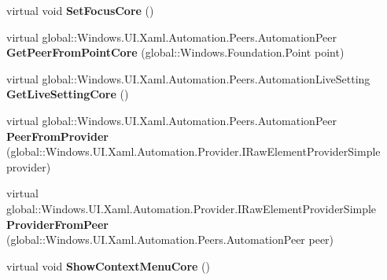\begin{DoxyCompactItemize}
virtual void {\bfseries Set\+Focus\+Core} ()
\item 
\mbox{\label{class_windows_1_1_u_i_1_1_xaml_1_1_automation_1_1_peers_1_1_automation_peer_af1a638c64d6aba46c623ea842fc206ac}} 
virtual global\+::\+Windows.\+U\+I.\+Xaml.\+Automation.\+Peers.\+Automation\+Peer {\bfseries Get\+Peer\+From\+Point\+Core} (global\+::\+Windows.\+Foundation.\+Point point)
\item 
\mbox{\label{class_windows_1_1_u_i_1_1_xaml_1_1_automation_1_1_peers_1_1_automation_peer_a237b9e6ecc2fb3779ea808e8460aaa07}} 
virtual global\+::\+Windows.\+U\+I.\+Xaml.\+Automation.\+Peers.\+Automation\+Live\+Setting {\bfseries Get\+Live\+Setting\+Core} ()
\item 
\mbox{\label{class_windows_1_1_u_i_1_1_xaml_1_1_automation_1_1_peers_1_1_automation_peer_afb1e787b7ca36dd06affdaa830a30a27}} 
virtual global\+::\+Windows.\+U\+I.\+Xaml.\+Automation.\+Peers.\+Automation\+Peer {\bfseries Peer\+From\+Provider} (global\+::\+Windows.\+U\+I.\+Xaml.\+Automation.\+Provider.\+I\+Raw\+Element\+Provider\+Simple provider)
\item 
\mbox{\label{class_windows_1_1_u_i_1_1_xaml_1_1_automation_1_1_peers_1_1_automation_peer_a8d1ce21375148b3c860bc66fa5df87fa}} 
virtual global\+::\+Windows.\+U\+I.\+Xaml.\+Automation.\+Provider.\+I\+Raw\+Element\+Provider\+Simple {\bfseries Provider\+From\+Peer} (global\+::\+Windows.\+U\+I.\+Xaml.\+Automation.\+Peers.\+Automation\+Peer peer)
\item 
\mbox{\label{class_windows_1_1_u_i_1_1_xaml_1_1_automation_1_1_peers_1_1_automation_peer_a4cf8c7b7bc669694fbf6115b9d508e66}} 
virtual void {\bfseries Show\+Context\+Menu\+Core} ()
\item 
\mbox{\label{class_windows_1_1_u_i_1_1_xaml_1_1_automation_1_1_peers_1_1_automation_peer_a7554757fd9d004f2179de9d68645070c}} 

\end{DoxyCompactItemize}
